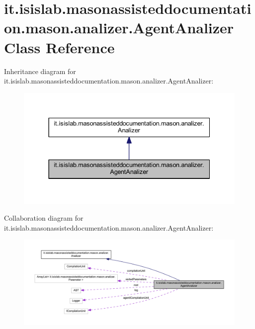\hypertarget{classit_1_1isislab_1_1masonassisteddocumentation_1_1mason_1_1analizer_1_1_agent_analizer}{\section{it.\-isislab.\-masonassisteddocumentation.\-mason.\-analizer.\-Agent\-Analizer Class Reference}
\label{classit_1_1isislab_1_1masonassisteddocumentation_1_1mason_1_1analizer_1_1_agent_analizer}
}


Inheritance diagram for it.\-isislab.\-masonassisteddocumentation.\-mason.\-analizer.\-Agent\-Analizer\-:\nopagebreak
\begin{figure}[H]
\begin{center}
\leavevmode
\includegraphics[width=337pt]{classit_1_1isislab_1_1masonassisteddocumentation_1_1mason_1_1analizer_1_1_agent_analizer__inherit__graph}
\end{center}
\end{figure}


Collaboration diagram for it.\-isislab.\-masonassisteddocumentation.\-mason.\-analizer.\-Agent\-Analizer\-:\nopagebreak
\begin{figure}[H]
\begin{center}
\leavevmode
\includegraphics[width=350pt]{classit_1_1isislab_1_1masonassisteddocumentation_1_1mason_1_1analizer_1_1_agent_analizer__coll__graph}
\end{center}
\end{figure}
